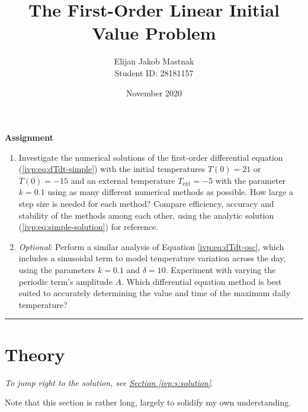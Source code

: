 \documentclass[11pt, a4paper]{article}
\begin{document}
\title{The First-Order Linear Initial Value Problem}
\author{Elijan Jakob Mastnak\\[1mm]\small{Student ID: 28181157}}
\date{November 2020}
\maketitle

\tableofcontents

\newpage
\begin{center}
\textbf{Assignment}
\begin{enumerate}
	\item Investigate the numerical solutions of the first-order differential equation (\ref{ivp:eq:dTdt-simple}) with the initial temperatures $ T(0) = 21 $ or $ T(0) = -15 $ and an external temperature $ T_{\text{ext}} = -5 $ with the parameter $ k = 0.1 $ using as many different numerical methods as possible. How large a step size is needed for each method? Compare efficiency, accuracy and stability of the methods among each other, using the analytic solution (\ref{ivp:eq:simple-solution}) for reference. 
	
	
	\item \textit{Optional}: Perform a similar analysis of Equation \ref{ivp:eq:dTdt-osc}, which includes a sinusoidal term to model temperature variation across the day, using the parameters $ k = 0.1 $ and $ \delta = 10 $. Experiment with varying the periodic term's amplitude $ A $. Which differential equation method is best suited to accurately determining the value and time of the maximum daily temperature? 
\end{enumerate}
\end{center}

\vspace{2mm}

\rule{\textwidth}{0.2pt}

\section{Theory} \label{ivp:s:theory}
\vspace{-2mm}
\textit{To jump right to the solution, see \hyperref[ivp:s:solution]{Section \ref{ivp:s:solution}}}.

Note that this section is rather long, largely to solidify my own understanding.
\end{document}

